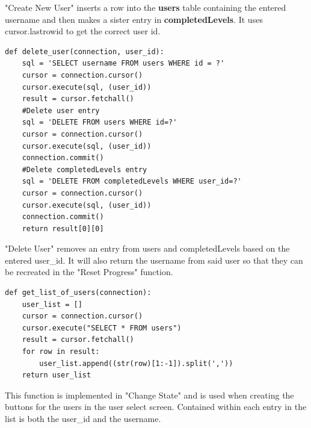 \documentclass{article}
\begin{document}
"Create New User" inserts a row into the \textbf{users} table containing the entered username and then makes a sister entry in \textbf{completedLevels}. It uses
cursor.lastrowid to get the correct user id.
\clearpage
\begin{lstlisting}
def delete_user(connection, user_id):
    sql = 'SELECT username FROM users WHERE id = ?'
    cursor = connection.cursor()
    cursor.execute(sql, (user_id))
    result = cursor.fetchall()
    #Delete user entry
    sql = 'DELETE FROM users WHERE id=?'
    cursor = connection.cursor()
    cursor.execute(sql, (user_id))
    connection.commit()
    #Delete completedLevels entry
    sql = 'DELETE FROM completedLevels WHERE user_id=?'
    cursor = connection.cursor()
    cursor.execute(sql, (user_id))
    connection.commit()
    return result[0][0]
\end{lstlisting}
"Delete User" removes an entry from users and completedLevels based on the entered user\_id. It will also return the username from said user so that they can
be recreated in the "Reset Progress" function.

\begin{lstlisting}
def get_list_of_users(connection):
    user_list = []
    cursor = connection.cursor()
    cursor.execute("SELECT * FROM users")
    result = cursor.fetchall()
    for row in result:
        user_list.append((str(row)[1:-1]).split(','))
    return user_list
\end{lstlisting}
This function is implemented in "Change State" and is used when creating the buttons for the users in the user select screen. Contained within each
entry in the list is both the user\_id and the username.
\end{document}
